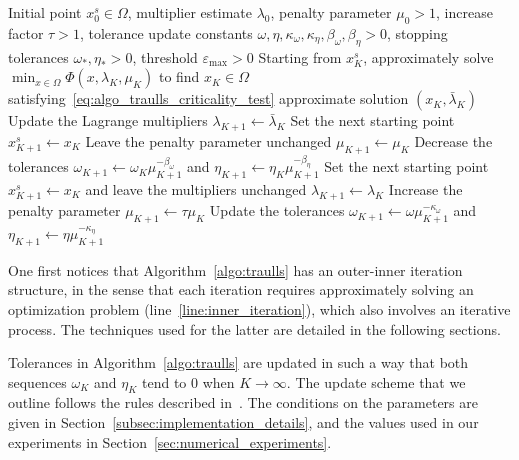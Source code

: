 \documentclass{article}
\numberwithin{equation}{section}
\newcommand{\calT}{{\mathcal{T}}}
\newcommand{\proj}[2]{P_{#1} \left[ {#2} \right]} %
\theoremstyle{plain}
\begin{document}
\begin{algorithm}
	\caption{Augmented Lagrangian algorithm}\label{algo:traulls}
	\begin{algorithmic}[1]
		\Require Initial point $x^s_0 \in \Omega$, multiplier estimate $\lambda_0$, penalty parameter $\mu_0 > 1$, increase factor $\tau > 1$, tolerance update constants $\omega,\eta,\kappa_\omega,\kappa_\eta,\beta_\omega,\beta_\eta > 0$, stopping tolerances $\omega_*,\eta_* > 0$, threshold $\varepsilon_{\max} > 0$
		\State\label{line:inner_iteration} Starting from $x_K^s$, approximately solve $\min_{x\in \Omega} \Phi(x,\lambda_K,\mu_K)$ to find $x_K \in \Omega$ satisfying~\eqref{eq:algo_traulls_criticality_test}
		\If{\(\|\proj{\calT_{\varepsilon_*}(x_K)}{-\nabla_x\Phi_K}\| \le \omega_*\), with $\varepsilon_* = \min(\varepsilon_{\max},\omega_*)$, and \(\left\Vert c(x_K)\right\Vert \le \eta_*\)}
		 \Return approximate solution $(x_K,\bar{\lambda}_K)$
		\EndIf
		\State Update the Lagrange multipliers $\lambda_{K+1}\gets \bar{\lambda}_K$ 
		\State Set the next starting point $x_{K+1}^s \gets x_K $
		\State Leave the penalty parameter unchanged \(\mu_{K+1} \gets \mu_K\)
		\State Decrease the tolerances $\omega_{K+1}\gets \omega_K \mu_{K+1}^{-\beta_\omega}$ and $\eta_{K+1}\gets \eta_K \mu_{K+1}^{-\beta_\eta}$
		\Else{}
		\State Set the next starting point $x_{K+1}^s \gets x_K$ and leave the multipliers unchanged $\lambda_{K+1} \gets \lambda_K$
		\State Increase the penalty parameter $\mu_{K+1} \gets \tau\mu_K$
		\State Update the tolerances $\omega_{K+1}\gets \omega \mu_{K+1}^{-\kappa_\omega}$ and $\eta_{K+1}\gets \eta \mu_{K+1}^{-\kappa_\eta}$
		\EndIf
		\EndFor
	\end{algorithmic}
\end{algorithm}
One first notices that Algorithm~\ref{algo:traulls} has an outer-inner iteration structure, in the sense that each iteration requires approximately solving an optimization problem (line~\ref{line:inner_iteration}), which also involves an iterative process. The techniques used for the latter are detailed in the following sections.

Tolerances in Algorithm~\ref{algo:traulls} are updated in such a way that both sequences $\omega_K$ and $\eta_K$ tend to $0$ when $K \to \infty$. The update scheme that we outline follows the rules described in~\cite[Algorithm~14.4.2]{conn-etal:2000}. The conditions on the parameters are given in Section~\ref{subsec:implementation_details}, and the values used in our experiments in Section~\ref{sec:numerical_experiments}.
\end{document}
